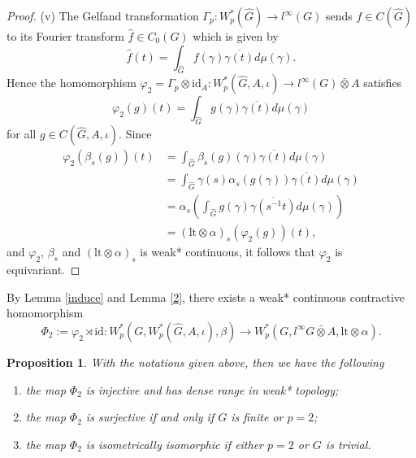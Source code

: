 \documentclass[reqno,11pt]{amsart}
\theoremstyle{plain}
\newtheorem{prop}[thm]{Proposition}
\theoremstyle{definition}
\theoremstyle{remark}
\begin{document}
\begin{proof}
(v) The Gelfand transformation $\Gamma_p:W^*_p(\hat{G})\rightarrow l^\infty(G)$ sends $f\in C(\hat{G})$ to its Fourier transform  $\hat{f}\in C_0(G)$ which is given by $$\hat{f}(t)=\int_{\hat{G}} f(\gamma)\overline{\gamma(t)}d\mu(\gamma).$$
Hence the homomorphism $\varphi_2=\Gamma_p\otimes \mathrm{id}_A:W^*_p(\hat{G},A,\iota)\rightarrow l^\infty(G)\bar{\otimes} A$ satisfies
$$\varphi_2(g)(t)=\int_{\hat{G}}g(\gamma)\overline{\gamma(t)}d\mu(\gamma)$$ for all $g\in C(\hat{G},A,\iota)$.
Since
$$\begin{aligned} \varphi_2(\beta_{s}(g))(t) &= \int_{\hat{G}}\beta_{s}(g)(\gamma)\overline{\gamma(t)}d\mu(\gamma) \\
 &=\int_{\hat{G}}\gamma(s)\alpha_{s}(g(\gamma))\overline{\gamma(t)}d\mu(\gamma)\\
 &=\alpha_{s}(\int_{\hat{G}}g(\gamma)\overline{\gamma(s^{-1}t)}d\mu(\gamma))\\
 &=(\mathrm{lt}\otimes\alpha)_{s}(\varphi_2(g))(t), \end{aligned}$$
and $\varphi_2$, $\beta_s$ and $(\mathrm{lt}\otimes\alpha)_{s}$ is weak* continuous,
it follows that $\varphi_2$ is equivariant.\end{proof}


By Lemma \ref{induce} and Lemma \ref{2}, there exists a weak* continuous contractive homomorphism $$\Phi_2:=\varphi_2\rtimes\mathrm{id}:W^*_p(G,W^*_p(\hat{G},A,\iota),\beta)\rightarrow W^*_p(G,l^\infty{G}\bar{\otimes} A,\mathrm{lt}\otimes\alpha).$$
\begin{prop} \label{22}
With the notations given above, then we have the following
\begin{enumerate}
\item[(i)] the map $\Phi_2$ is injective and has dense range in weak* topology;
\item[(ii)] the map $\Phi_2$ is surjective if and only if $G$ is finite or $p=2$;
\item [(iii)] the map $\Phi_2$ is isometrically isomorphic if either $p=2$ or $G$ is trivial.
\end{enumerate}
\end{prop}
\end{document}
